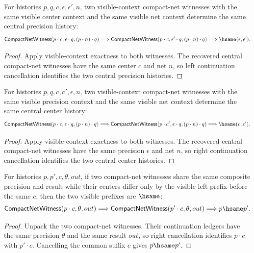 \begin{theorem}
\label{thm:compact-net-witness-visible-context-precision-deterministic}
For histories $p,q,c,\epsilon,\epsilon',n$, two visible-context compact-net
witnesses with the same visible center context and the same visible net context
determine the same central precision history:
$$
\mathsf{CompactNetWitness}(p\cdot c,\epsilon\cdot q,(p\cdot n)\cdot q)
\Longrightarrow
\mathsf{CompactNetWitness}(p\cdot c,\epsilon'\cdot q,(p\cdot n)\cdot q)
\Longrightarrow
\hsame(\epsilon,\epsilon').
$$
\end{theorem}
\begin{proof}
Apply visible-context exactness to both witnesses. The recovered central
compact-net witnesses have the same center $c$ and net $n$, so left
continuation cancellation identifies the two central precision histories.
\end{proof}

\begin{theorem}
\label{thm:compact-net-witness-visible-context-center-deterministic}
For histories $p,q,c,c',\epsilon,n$, two visible-context compact-net witnesses
with the same visible precision context and the same visible net context
determine the same central center history:
$$
\mathsf{CompactNetWitness}(p\cdot c,\epsilon\cdot q,(p\cdot n)\cdot q)
\Longrightarrow
\mathsf{CompactNetWitness}(p\cdot c',\epsilon\cdot q,(p\cdot n)\cdot q)
\Longrightarrow
\hsame(c,c').
$$
\end{theorem}
\begin{proof}
Apply visible-context exactness to both witnesses. The recovered central
compact-net witnesses have the same precision $\epsilon$ and net $n$, so right
continuation cancellation identifies the two central center histories.
\end{proof}

\begin{theorem}
\label{thm:compact-net-witness-common-composite-result-prefix-deterministic}
For histories $p,p',c,\theta,out$, if two compact-net witnesses share the same
composite precision and result while their centers differ only by the visible
left prefix before the same $c$, then the two visible prefixes are $\hsame$:
$$
\mathsf{CompactNetWitness}(p\cdot c,\theta,out)
\Longrightarrow
\mathsf{CompactNetWitness}(p'\cdot c,\theta,out)
\Longrightarrow
p\hsame p'.
$$
\end{theorem}
\begin{proof}
Unpack the two compact-net witnesses. Their continuation ledgers have the same
precision $\theta$ and the same result $out$, so right cancellation identifies
$p\cdot c$ with $p'\cdot c$. Cancelling the common suffix $c$ gives
$p\hsame p'$.
\end{proof}

